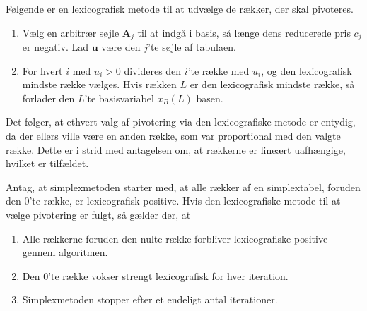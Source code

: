 %
Følgende er en lexicografisk metode til at udvælge de rækker, der skal pivoteres.
\begin{enumerate}
\item Vælg en arbitrær søjle $\textbf{A}_j$ til at indgå i basis, så længe dens reducerede pris $c_j$ er negativ.
Lad $\textbf{u}$ være den $j$'te søjle af tabulaen.
\item For hvert $i$ med $u_i>0$ divideres den $i$'te række med $u_i$, og den lexicografisk mindste række vælges. 
Hvis rækken $L$ er den lexicografisk mindste række, så forlader den $L$'te basisvariabel $x_B(L)$ basen.
\end{enumerate}
%
Det følger, at ethvert valg af pivotering via den lexicografiske metode er entydig, da der ellers ville være en anden række, som var proportional med den valgte række. 
Dette er i strid med antagelsen om, at rækkerne er lineært uafhængige, hvilket er tilfældet.
%
\begin{thm}{}{}
Antag, at simplexmetoden starter med, at alle rækker af en simplextabel, foruden den $0$'te række, er lexicografisk positive. Hvis den lexicografiske metode til at vælge pivotering er fulgt, så gælder der, at
\begin{enumerate}[label=(\alph*)]
\item Alle rækkerne foruden den nulte række forbliver lexicografiske positive gennem algoritmen.
\item Den $0$'te række vokser strengt lexicografisk for hver iteration.
\item Simplexmetoden stopper efter et endeligt antal iterationer. 
\end{enumerate}
\end{thm}
%
